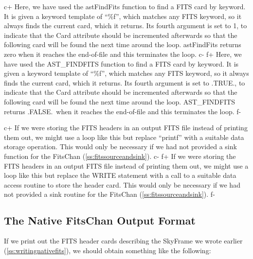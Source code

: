 \documentclass[twoside,11pt]{article}
\newcommand{\secref}[1]{\S\ref{#1}}
\renewcommand{\secref}[1]{\ref{#1}}
\begin{document}
c+
Here, we have used the astFindFits function to find a FITS card by
keyword. It is given a keyword template of ``\%f'', which matches any
FITS keyword, so it always finds the current card, which it
returns. Its fourth argument is set to 1, to indicate that the Card
attribute should be incremented afterwards so that the following card
will be found the next time around the loop. astFindFits returns zero
when it reaches the end-of-file and this terminates the loop.
c-
f+
Here, we have used the AST\_FINDFITS function to find a FITS card by
keyword. It is given a keyword template of ``\%f'', which matches any
FITS keyword, so it always finds the current card, which it
returns. Its fourth argument is set to .TRUE., to indicate that the
Card attribute should be incremented afterwards so that the following
card will be found the next time around the loop. AST\_FINDFITS
returns .FALSE.\ when it reaches the end-of-file and this terminates
the loop.
f-

c+
If we were storing the FITS headers in an output FITS file instead of
printing them out, we might use a loop like this but replace
``printf'' with a suitable data storage operation. This would only be
necessary if we had not provided a sink function for the FitsChan
(\secref{ss:fitssourceandsink}).
c-
f+
If we were storing the FITS headers in an output FITS file instead of
printing them out, we might use a loop like this but replace the WRITE
statement with a call to a suitable data access routine to store the
header card. This would only be necessary if we had not provided a
sink routine for the FitsChan (\secref{ss:fitssourceandsink}).
f-

\subsection{The Native FitsChan Output Format}

If we print out the FITS header cards describing the SkyFrame we wrote
earlier (\secref{ss:writingnativefits}), we should obtain something
like the following:
\end{document}
